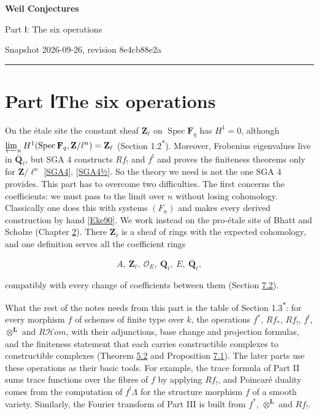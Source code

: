 \documentclass[11pt]{article}
\newcommand{\bpout}[1]{#1\textsuperscript{\hyperlink{bp-outside}{\ensuremath{\ast}}}}
\providecommand{\cHom}{}\renewcommand{\cHom}{R\mathcal{H}\!om}
\begin{document}
\pagestyle{plain}
\begin{center}
{\LARGE\bfseries Weil Conjectures\par}
\vspace{0.7em}
{\large Part Ⅰ: The six operations\par}
\vspace{0.5em}
{\small\color{bpmuted}Snapshot 2026-09-26, revision 8e4cb88e2a\par}
\end{center}
\vspace{0.5em}
{\small\tableofcontents}
\bigskip\hrule\bigskip

\part*{\texorpdfstring{Part Ⅰ\quad The six operations}{Part Ⅰ The six operations}}
\label{bp1}%
\label{bp2}%
On the étale site the constant sheaf \(\mathbf Z_\ell\) on \(\operatorname{Spec}\mathbf F_q\) has \(H^1=0\), although \(\varprojlim_nH^1(\operatorname{Spec}\mathbf F_q,\mathbf Z/\ell^n)=\mathbf Z_\ell\) (Section \bpout{1.2}). Moreover, Frobenius eigenvalues live in \(\overline{\mathbf Q}_\ell\), but SGA 4 constructs \(Rf_!\) and \(f^!\) and proves the finiteness theorems only for \(\mathbf Z/\ell^n\) [\hyperref[bp702]{SGA4}], [\hyperref[bp703]{SGA4½}]. So the theory we need is not the one SGA 4 provides. This part has to overcome two difficulties. The first concerns the coefficients: we must pass to the limit over \(n\) without losing cohomology. Classically one does this with systems \((F_n)\) and makes every derived construction by hand [\hyperref[bp704]{Eke90}]. We work instead on the pro-étale site of Bhatt and Scholze (Chapter \hyperref[bp3]{2}). There \(\mathbf Z_\ell\) is a sheaf of rings with the expected cohomology, and one definition serves all the coefficient rings

\[
A,\ \mathbf Z_\ell,\ \mathcal O_E,\ \mathbf Q_\ell,\ E,\ \overline{\mathbf Q}_\ell,
\]

compatibly with every change of coefficients between them (Section \hyperref[bp608]{7.2}).

What the rest of the notes needs from this part is the table of Section \bpout{1.3}: for every morphism \(f\) of schemes of finite type over \(k\), the operations \(f^*\), \(Rf_*\), \(Rf_!\), \(f^!\), \(\otimes^{\mathbf L}\) and \(\cHom\), with their adjunctions, base change and projection formulas, and the finiteness statement that each carries constructible complexes to constructible complexes (Theorem \hyperref[bp413]{5.2} and Proposition \hyperref[bp605]{7.1}). The later parts use these operations as their basic tools. For example, the trace formula of Part II sums trace functions over the fibres of \(f\) by applying \(Rf_!\), and Poincaré duality comes from the computation of \(f^!\Lambda\) for the structure morphism \(f\) of a smooth variety. Similarly, the Fourier transform of Part III is built from \(f^*\), \(\otimes^{\mathbf L}\) and \(Rf_!\).
\end{document}
